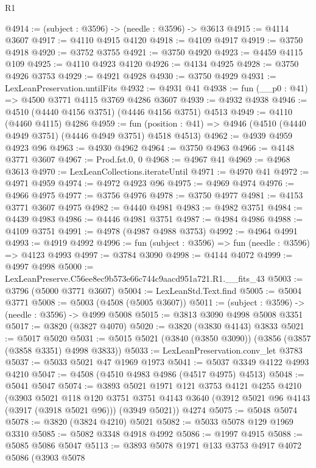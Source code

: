 \begin{lexlean}{R1}
\begin{coremodule}
@4914 := (subject : @3596) -> (needle : @3596) -> @3613
@4915 := @4114 @3607
@4917 := @4110 @4915 @4120
@4918 := @4109 @4917
@4919 := @3750 @4918
@4920 := @3752 @3755
@4921 := @3750 @4920
@4923 := @4459 @4115 @109
@4925 := @4110 @4923 @4120
@4926 := @4134 @4925
@4928 := @3750 @4926 @3753
@4929 := @4921 @4928
@4930 := @3750 @4929
@4931 := LexLeanPreservation.untilFits
@4932 := @4931 @41
@4938 := fun (__p0 : @41) => @4500 @3771 @4115 @3769 @4286 @3607
@4939 := @4932 @4938
@4946 := @4510 (@4440 @4156 @3751) (@4446 @4156 @3751) @4513
@4949 := @4110 (@4460 @4115) @4286
@4959 := fun (position : @41) => @4946 (@4510 (@4440 @4949 @3751) (@4446 @4949 @3751) @4518 @4513)
@4962 := @4939 @4959 @4923 @96
@4963 := @4930 @4962
@4964 := @3750 @4963
@4966 := @4148 @3771 @3607
@4967 := Prod.fst.{0, 0}
@4968 := @4967 @41
@4969 := @4968 @3613
@4970 := LexLeanCollections.iterateUntil
@4971 := @4970 @41
@4972 := @4971 @4959
@4974 := @4972 @4923 @96
@4975 := @4969 @4974
@4976 := @4966 @4975
@4977 := @3756 @4976
@4978 := @3750 @4977
@4981 := @4153 @3771 @3607 @4975
@4982 := @4440 @4981
@4983 := @4982 @3751
@4984 := @4439 @4983
@4986 := @4446 @4981 @3751
@4987 := @4984 @4986
@4988 := @4109 @3751
@4991 := @4978 (@4987 @4988 @3753)
@4992 := @4964 @4991
@4993 := @4919 @4992
@4996 := fun (subject : @3596) => fun (needle : @3596) => @4123 @4993
@4997 := @3784 @3090
@4998 := @4144 @4072
@4999 := @4997 @4998
@5000 := LexLeanPreserve.C56ee8ec9b573e66c744c9aacd951a721.R1.__fits_43
@5003 := @3796 (@5000 @3771 @3607)
@5004 := LexLeanStd.Text.find
@5005 := @5004 @3771
@5008 := @5003 (@4508 (@5005 @3607))
@5011 := (subject : @3596) -> (needle : @3596) -> @4999 @5008
@5015 := @3813 @3090 @4998 @5008 @3351
@5017 := @3820 (@3827 @4070)
@5020 := @3820 (@3830 @4143) @3833
@5021 := @5017 @5020
@5031 := @5015 @5021 (@3840 (@3850 @3090)) (@3856 (@3857 (@3858 @3351) @4998 @3833))
@5033 := LexLeanPreservation.conv_let @3783
@5037 := @5033 @5021 @47 @1969 @1973
@5041 := @5037 @3349 @4122 @4993 @4210
@5047 := @4508 (@4510 @4983 @4986 (@4517 @4975) @4513)
@5048 := @5041 @5047
@5074 := @3893
    @5021
    @1971
    @121
    @3753
    @4121
    @4255
    @4210
    (@3903
      @5021
      @118
      @120
      @3751
      @3751
      @4143
      @3640
      (@3912 @5021 @96 @4143 (@3917 (@3918 @5021 @96)))
      (@3949 @5021))
    @4274
@5075 := @5048 @5074
@5078 := @3820 (@3824 @4210) @5021
@5082 := @5033 @5078 @129 @1969 @3310
@5085 := @5082 @3348 @4918 @4992
@5086 := @1997 @4915
@5088 := @5085 @5086 @5047
@5113 := @3893
    @5078
    @1971
    @133
    @3753
    @4917
    @4072
    @5086
    (@3903
      @5078

\end{coremodule}
\end{lexlean}
